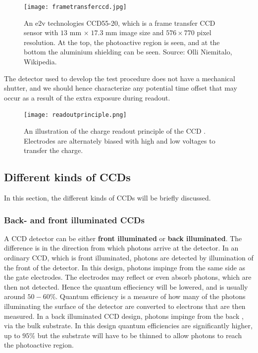 \documentclass[../main.tex]{subfiles}
\begin{document}
	\begin{figure}
		\centering
		\texttt{[image: frametransferccd.jpg]}
		\caption{An e2v technologies CCD55-20, which is a frame transfer CCD sensor with $13$ mm $\times \;17.3$ mm image size and $576 \times 770$ pixel resolution. At the top, the photoactive region is seen, and at the bottom the aluminium shielding can be seen. Source: Olli Niemitalo, Wikipedia.} 
		\label{fig:ccdframetransfer}
	\end{figure}
	
	The detector used to develop the test procedure does not have a mechanical shutter, and we should hence characterize any potential time offset that may occur as a result of the extra exposure during readout.
	
	\begin{figure}
		\centering
		\texttt{[image: readoutprinciple.png]}
		\caption{An illustration of the charge readout principle of the CCD \cite{teledyneart}. Electrodes are alternately biased with high and low voltages to transfer the charge.
		} 
		\label{fig:ccdreadout}
	\end{figure}

	\subsection{Different kinds of CCDs}
	In this section, the different kinds of CCDs will be briefly discussed.
	
	\subsubsection{Back- and front illuminated CCDs}
	
	A CCD detector can be either \textbf{front illuminated} or \textbf{back illuminated}. The difference is in the direction from which photons arrive at the detector. In an ordinary CCD, which is front illuminated, photons are detected by illumination of the front of the detector. In this design, photons impinge from the same side as the gate electrodes. The electrodes may reflect or even absorb photons, which are then not detected. Hence the quantum effieciency will be lowered, and is usually around $50-60\%$\cite{backilluone}. Quantum efficiency is a measure of how many of the photons illuminating the surface of the detector are converted to electrons that are then measured. In a back illuminated CCD design, photons impinge from the back \cite{backillutwo}, via the bulk substrate. In this design quantum efficiencies are significantly higher, up to $95\%$\cite{backilluone} but the substrate will have to be thinned to allow photons to reach the photoactive region.
	
\end{document}
